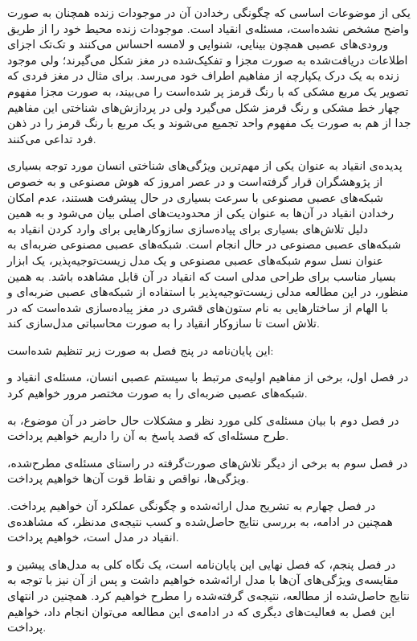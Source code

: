 \documentclass[12pt]{report}
\begin{document}
	یکی از موضوعات اساسی که چگونگی رخدادن آن در موجودات زنده همچنان به صورت واضح مشخص نشده‌است، مسئله‌ی انقیاد است. موجودات زنده محیط خود را از طریق ورودی‌های عصبی همچون بینایی، شنوایی و لامسه احساس می‌کنند و تک‌تک اجزای اطلاعات دریافت‌شده به صورت مجزا و تفکیک‌شده در مغز شکل می‌گیرند؛ ولی  موجود زنده به یک درک یکپارچه از مفاهیم اطراف خود می‌رسد. برای مثال در مغز فردی که تصویر یک مربع مشکی که با رنگ قرمز پر شده‌‌است را می‌بیند، به صورت مجزا مفهوم چهار خط مشکی و رنگ قرمز شکل می‌گیرد ولی در پردازش‌های شناختی  این مفاهیم جدا از هم به صورت یک مفهوم واحد تجمیع می‌شوند و یک مربع با رنگ قرمز را در ذهن فرد تداعی می‌کنند.
	
	پدیده‌ی انقیاد به عنوان یکی از مهم‌ترین ویژگی‌های شناختی انسان مورد توجه بسیاری از پژوهشگران قرار گرفته‌است و در عصر امروز که هوش مصنوعی و به خصوص شبکه‌های عصبی مصنوعی با سرعت بسیاری در حال پیشرفت هستند، عدم امکان رخدادن انقیاد در آن‌ها به عنوان یکی از محدودیت‌های اصلی بیان می‌شود و به همین دلیل تلاش‌های بسیاری برای پیاده‌سازی سازوکار‌هایی برای وارد کردن انقیاد به شبکه‌های عصبی مصنوعی در حال انجام است. شبکه‌های عصبی مصنوعی ضربه‌ای به عنوان نسل سوم شبکه‌های عصبی مصنوعی و یک مدل زیست‌توجیه‌پذیر، یک ابزار بسیار مناسب برای طراحی مدلی است که انقیاد در آن قابل مشاهده باشد. به همین منظور، در این مطالعه مدلی زیست‌توجیه‌پذیر با استفاده از شبکه‌های عصبی ضربه‌ای و با الهام از ساختار‌هایی به نام ستون‌های قشری در مغز پیاده‌سازی شده‌است که در تلاش است تا سازوکار انقیاد را به صورت محاسباتی مدل‌سازی کند.
	
	این پایان‌نامه در پنج فصل به صورت زیر تنظیم شده‌است:
	
در فصل اول، برخی از مفاهیم اولیه‌ی مرتبط با سیستم عصبی انسان، مسئله‌ی انقیاد و شبکه‌های عصبی ضربه‌ای را به صورت مختصر مرور خواهیم کرد.

در فصل دوم با بیان مسئله‌ی کلی مورد نظر و مشکلات حال حاضر در آن موضوع، به طرح مسئله‌ای که قصد پاسخ به آن را داریم خواهیم پرداخت.

در فصل سوم به برخی از دیگر تلاش‌های صورت‌گرفته در راستای مسئله‌ی مطرح‌شده، ویژگی‌ها، نواقص و نقاط قوت آن‌ها خواهیم پرداخت.

در فصل چهارم به تشریح مدل ارائه‌شده و چگونگی عملکرد آن خواهیم پرداخت. همچنین در ادامه، به بررسی نتایج حاصل‌شده و کسب نتیجه‌ی مدنظر، که مشاهده‌ی انقیاد در مدل است، خواهیم پرداخت.

در فصل پنجم، که فصل نهایی این پایان‌نامه است، یک نگاه کلی به مدل‌های پیشین و مقایسه‌ی ویژگی‌های آن‌ها با مدل ارائه‌شده خواهیم داشت و پس از آن نیز با توجه به نتایج حاصل‌شده از مطالعه، نتیجه‌ی گرفته‌شده را مطرح خواهیم کرد. همچنین در انتهای این فصل به فعالیت‌های دیگری که در ادامه‌ی این مطالعه می‌توان انجام داد، خواهیم پرداخت. 
	
\end{document}
